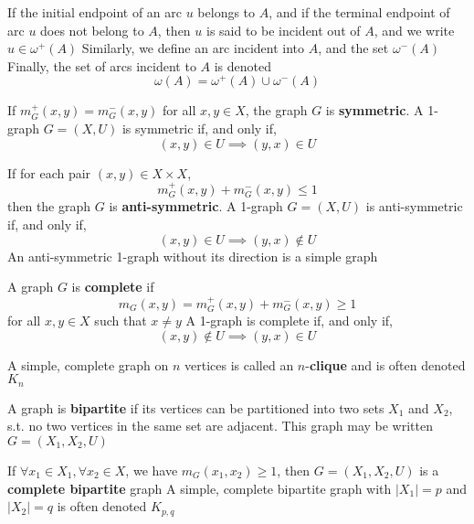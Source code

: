 \documentclass[aspectratio=43]{beamer}
\begin{document}
\begin{frame}
\begin{definition}
If the initial endpoint of an arc $u$ belongs to $A$, and if the terminal endpoint of arc $u$ does not belong to $A$, then $u$ is said to be incident out of $A$, and we write $u\in\omega^+(A)$
\vskip0.5cm
Similarly, we define an arc incident into $A$, and the set $\omega^-(A)$
\vskip0.5cm
Finally, the set of arcs incident to $A$ is denoted
\[
\omega(A) = \omega^+(A)\cup\omega^-(A)
\]
\end{definition}
\end{frame}


\begin{frame}
\begin{definition}
If $m_G^+(x,y)=m_G^-(x,y)$ for all $x,y\in X$, the graph $G$ is
\textbf{symmetric}. A 1-graph $G=(X,U)$ is symmetric if, and only if,
\[
(x,y)\in U\implies (y,x)\in U
\]
\end{definition}
\vfill
\begin{definition}
If for each pair $(x,y)\in X\times X$,
\[
m_G^+(x,y)+m_G^-(x,y)\leq 1
\]
then the graph $G$ is \textbf{anti-symmetric}. A 1-graph $G=(X,U)$ is anti-symmetric if, and only if,
\[
(x,y)\in U\implies (y,x)\not\in U
\]
An anti-symmetric 1-graph without its direction is a simple graph
\end{definition}
\end{frame}


\begin{frame}
\begin{definition}
A graph $G$ is \textbf{complete} if
\[
m_G(x,y)=m_G^+(x,y)+m_G^-(x,y)\geq 1
\]
for all $x,y\in X$ such that $x\neq y$
\vskip0.2cm
A 1-graph is complete if, and only if,
\[
(x,y)\not\in U\implies (y,x)\in U
\]
\end{definition}
\vfill
\begin{definition}[$n$-clique]
A simple, complete graph on $n$ vertices is called an $n$-\textbf{clique} and is often denoted $K_n$
\end{definition}
\end{frame}

\begin{frame}
\begin{definition}
A graph is \textbf{bipartite} if its vertices can be partitioned into two sets $X_1$ and $X_2$, s.t. no two vertices in the same set are adjacent.
This graph may be written $G=(X_1,X_2,U)$
\end{definition}
\vfill
\begin{definition}
If $\forall x_1\in X_1, \forall x_2\in X$, we have $m_G(x_1,x_2)\geq 1$, then $G=(X_1,X_2,U)$ is a \textbf{complete bipartite} graph
\vskip0.5cm
A simple, complete bipartite graph with $|X_1|=p$ and $|X_2|=q$ is often denoted $K_{p,q}$
\end{definition}
\end{frame}
\end{document}
